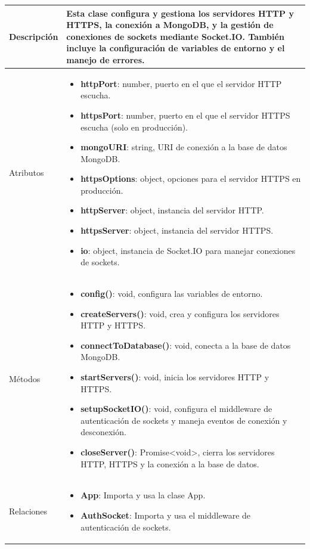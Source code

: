 \begin{longtable}{
    >{\columncolor{lightgreen!20}}p{4cm}
    p{12cm}
    }
    \midrule
    Descripción & Esta clase configura y gestiona los servidores HTTP y HTTPS, la conexión a MongoDB, y la gestión de conexiones de sockets mediante Socket.IO. También incluye la configuración de variables de entorno y el manejo de errores. \\
    \midrule
    Atributos & \begin{itemize}[nosep,leftmargin=*]
      \item \textbf{httpPort}: number, puerto en el que el servidor HTTP escucha.
      \item \textbf{httpsPort}: number, puerto en el que el servidor HTTPS escucha (solo en producción).
      \item \textbf{mongoURI}: string, URI de conexión a la base de datos MongoDB.
      \item \textbf{httpsOptions}: object, opciones para el servidor HTTPS en producción.
      \item \textbf{httpServer}: object, instancia del servidor HTTP.
      \item \textbf{httpsServer}: object, instancia del servidor HTTPS.
      \item \textbf{io}: object, instancia de Socket.IO para manejar conexiones de sockets.
    \end{itemize} \\
    \midrule
    Métodos & \begin{itemize}[nosep,leftmargin=*]
      \item \textbf{config()}: void, configura las variables de entorno.
      \item \textbf{createServers()}: void, crea y configura los servidores HTTP y HTTPS.
      \item \textbf{connectToDatabase()}: void, conecta a la base de datos MongoDB.
      \item \textbf{startServers()}: void, inicia los servidores HTTP y HTTPS.
      \item \textbf{setupSocketIO()}: void, configura el middleware de autenticación de sockets y maneja eventos de conexión y desconexión.
      \item \textbf{closeServer()}: Promise<void>, cierra los servidores HTTP, HTTPS y la conexión a la base de datos.
    \end{itemize} \\
    \midrule
    Relaciones & \begin{itemize}[nosep,leftmargin=*]
      \item \textbf{App}: Importa y usa la clase App.
      \item \textbf{AuthSocket}: Importa y usa el middleware de autenticación de sockets.
    \end{itemize} \\
    \end{longtable}

